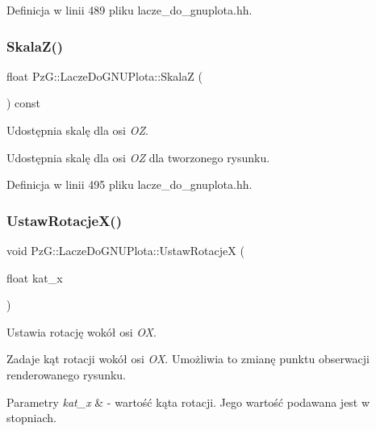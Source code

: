 Definicja w linii 489 pliku lacze\+\_\+do\+\_\+gnuplota.\+hh.

\mbox{\label{class_pz_g_1_1_lacze_do_g_n_u_plota_a44f922ccbc508d6cd7809c669238dae3}} 
\subsubsection{\texorpdfstring{Skala\+Z()}{SkalaZ()}}
{\footnotesize\ttfamily float Pz\+G\+::\+Lacze\+Do\+G\+N\+U\+Plota\+::\+SkalaZ (\begin{DoxyParamCaption}{ }\end{DoxyParamCaption}) const\hspace{0.3cm}{\ttfamily [inline]}}



Udostępnia skalę dla osi {\itshape OZ}. 

Udostępnia skalę dla osi {\itshape OZ} dla tworzonego rysunku. 

Definicja w linii 495 pliku lacze\+\_\+do\+\_\+gnuplota.\+hh.

\mbox{\label{class_pz_g_1_1_lacze_do_g_n_u_plota_a88324c53a70846fb6bc9d918ce21fd56}} 
\subsubsection{\texorpdfstring{Ustaw\+Rotacje\+X()}{UstawRotacjeX()}}
{\footnotesize\ttfamily void Pz\+G\+::\+Lacze\+Do\+G\+N\+U\+Plota\+::\+Ustaw\+RotacjeX (\begin{DoxyParamCaption}\item[{float}]{kat\+\_\+x }\end{DoxyParamCaption})\hspace{0.3cm}{\ttfamily [inline]}}



Ustawia rotację wokół osi {\itshape OX}. 

Zadaje kąt rotacji wokół osi {\itshape OX}. Umożliwia to zmianę punktu obserwacji renderowanego rysunku. 
\begin{DoxyParams}{Parametry}
{\em kat\+\_\+x} & -\/ wartość kąta rotacji. Jego wartość podawana jest w stopniach. \\
\hline
\end{DoxyParams}


